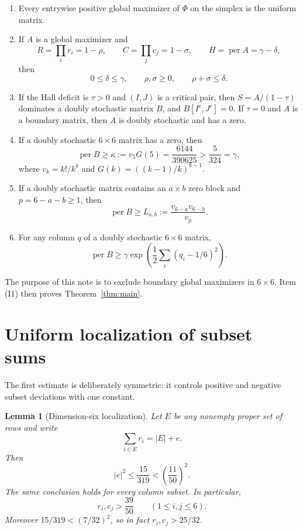 \documentclass[11pt]{article}
\newtheorem{lemma}[theorem]{Lemma}
\theoremstyle{definition}
\DeclareMathOperator{\permop}{per}
\newcommand{\g}{\gamma}
\begin{document}
\begin{enumerate}[label=\textup{(I\arabic*)},leftmargin=2.6em]
\item Every entrywise positive global maximizer of $\Phi$ on the simplex is
      the uniform matrix.
\item If $A$ is a global maximizer and
\[
 R=\prod_i r_i=1-\rho,\qquad
 C=\prod_j c_j=1-\sigma,\qquad
 H=\permop A=\g-\delta,
\]
then
\begin{equation}\label{eq:budget}
 0\le\delta\le\g,\qquad \rho,\sigma\ge0,
 \qquad \rho+\sigma\le\delta.
\end{equation}
\item If the Hall deficit is $\tau>0$ and $(I,J)$ is a critical pair, then
      $S=A/(1-\tau)$ dominates a doubly stochastic matrix $B$, and
      $B[I^c,J^c]=0$.  If $\tau=0$ and $A$ is a boundary matrix, then $A$ is
      doubly stochastic and has a zero.
\item If a doubly stochastic $6\times6$ matrix has a zero, then
\begin{equation}\label{eq:kappa}
 \permop B\ge\kappa:=v_5G(5)=\frac{6144}{390625}>\frac5{324}=\g,
\end{equation}
where $v_k=k!/k^k$ and $G(k)=((k-1)/k)^{k-1}$.
\item If a doubly stochastic matrix contains an $a\times b$ zero block and
      $p=6-a-b\ge1$, then
\begin{equation}\label{eq:sharp}
 \permop B\ge L_{a,b}:=\frac{v_{6-a}v_{6-b}}{v_p}.
\end{equation}
\item For any column $q$ of a doubly stochastic $6\times6$ matrix,
\begin{equation}\label{eq:column-entropy-inherited}
 \permop B\ge\g\exp\left(\frac12
 \sum_i(q_i-1/6)^2\right).
\end{equation}
\end{enumerate}

The purpose of this note is to exclude boundary global maximizers in
$6\times6$.  Item (I1) then proves Theorem~\ref{thm:main}.

\section{Uniform localization of subset sums}

The first estimate is deliberately symmetric: it controls positive and
negative subset deviations with one constant.

\begin{lemma}[Dimension-six localization]\label{lem:localization}
Let $E$ be any nonempty proper set of rows and write
\[
 \sum_{i\in E}r_i=|E|+e.
\]
Then
\begin{equation}\label{eq:localization}
 |e|^2\le\frac{15}{319}<\left(\frac{11}{50}\right)^2.
\end{equation}
The same conclusion holds for every column subset.  In particular,
\begin{equation}\label{eq:singleton-lower}
 r_i,c_j>\frac{39}{50}
 \qquad(1\le i,j\le6).
\end{equation}
Moreover $15/319<(7/32)^2$, so in fact $r_i,c_j>25/32$.
\end{lemma}
\end{document}
